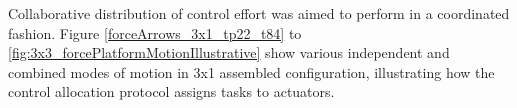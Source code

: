 Collaborative distribution of control effort was aimed to perform in a coordinated fashion. Figure \ref{forceArrows_3x1_tp22_t84} to \ref{fig:3x3_forcePlatformMotionIllustrative} show various independent and combined modes of motion in 3x1 assembled configuration, illustrating how the control allocation protocol assigns tasks to actuators.


 \begin{figure}[H]
	\centering
\end{figure}

